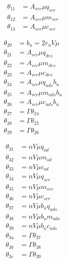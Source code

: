 \begin{minipage}{0.32\textwidth}
    \begin{align*}
        \theta_{11} &= A_{scr} \mu q_{scr} \\
        \theta_{12} &= A_{scr} \mu m_{scr} \\
        \theta_{13} &= A_{scr} \mu c_{scr}
    \end{align*}
\end{minipage}
\begin{minipage}{0.32 \textwidth}
    \begin{align*}
    \theta_{20} &= b_u = 2 r_u V \mu \\
    \theta_{21} &= A_{scr} \mu q_{des}\\
    \theta_{22} &= A_{scr} \mu m_{des}\\
    \theta_{23} &= A_{scr} \mu c_{des}\\
    \theta_{24} &= A_{scr} \mu q_{ads}b_u\\
    \theta_{25} &= A_{scr} \mu m_{ads}b_u\\
    \theta_{26} &= A_{scr} \mu c_{ads} b_u\\
    \theta_{27} &= \Gamma \theta_{24}\\
    \theta_{28} &= \Gamma \theta_{25}\\
    \theta_{29} &= \Gamma \theta_{26}
    \end{align*}
\end{minipage}
\begin{minipage}{0.32 \textwidth}
    \begin{align*}
    \theta_{31} &= n V \mu q_{od}\\
    \theta_{32} &= n V \mu m_{od} \\
    \theta_{33} &= n V \mu c_{od} \\
    \theta_{34} &= n V \mu q_{scr} \\
    \theta_{35} &= n V \mu m_{scr} \\
    \theta_{36} &= n V \mu c_{scr} \\
    \theta_{37} &= n V \mu b_u q_{ads} \\
    \theta_{38} &= n V \mu b_u m_{ads} \\
    \theta_{39} &= n V \mu b_u c_{ads}\\
    \theta_{3a} &= \Gamma \theta_{37}\\
    \theta_{3b} &= \Gamma \theta_{38}\\
    \theta_{3c} &= \Gamma \theta_{39}
    \end{align*}
\end{minipage}
